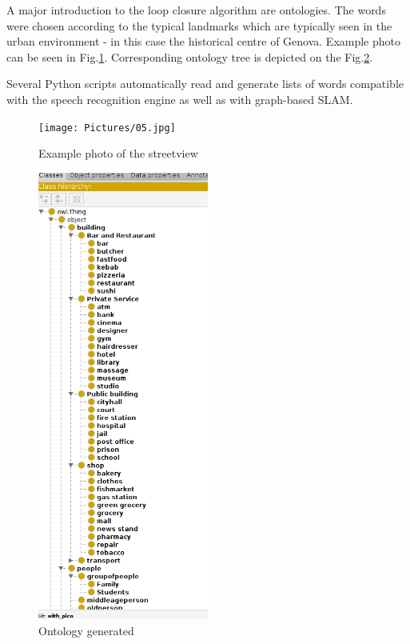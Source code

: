 \documentclass[conference]{IEEEtran}
\begin{document}
A major introduction to the loop closure algorithm are ontologies.
The words were chosen according to the typical landmarks which are typically seen in the urban environment - in this case the historical centre of Genova. Example photo can be seen in Fig.\ref{street view}. Corresponding ontology tree is depicted on the Fig.\ref{onto}.

Several Python scripts automatically read and generate lists of words compatible
with the speech recognition engine as well as with graph-based SLAM.

\begin{figure}[htbp]
    \centerline{\texttt{[image: Pictures/05.jpg]}}
    \caption{Example photo of the streetview}

    \label{street view}

\end{figure}



\begin{figure}[htbp]
    \centerline{\includegraphics[width=0.5\textwidth,height=0.4\textheight,keepaspectratio]{Pictures/onto.png}}
    \caption{Ontology generated}

    \label{onto}
\end{figure}
\end{document}
